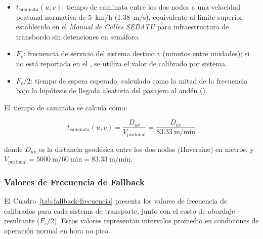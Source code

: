 \begin{itemize}
    \item $t_{\text{caminata}}(u, v)$: tiempo de caminata entre los dos nodos
    a una velocidad peatonal normativa de 5~km/h (1.38~m/s), equivalente al
    límite superior establecido en el \textit{Manual de Calles SEDATU}
\citep{sedatu2019manual} para infraestructura de transbordo sin detenciones
    en semáforo.
    \item $F_v$: frecuencia de servicio del sistema destino $v$ (minutos entre
    unidades); si no está reportada en el \geojson{}, se utiliza el valor
    de  calibrado por sistema.
    \item $F_v / 2$: tiempo de espera esperado, calculado como la mitad de la
    frecuencia bajo la hipótesis de llegada aleatoria del pasajero al andén
    ().
\end{itemize}

El tiempo de caminata se calcula como:

\begin{equation}
    t_{\text{caminata}}(u, v) = \frac{D_{uv}}{V_{\text{peatonal}}}
    = \frac{D_{uv}}{83.33\ \text{m/min}}
    \label{eq:t-caminata}
\end{equation}

donde $D_{uv}$ es la distancia geodésica entre los dos nodos (Haversine) en
metros, y
$V_{\text{peatonal}} = 5000\ \text{m} / 60\ \text{min} = 83.33\ \text{m/min}$.

\subsubsection{Valores de Frecuencia de Fallback}
\label{subsubsec:fallback-frecuencia}

El Cuadro~\ref{tab:fallback-frecuencia} presenta los valores de frecuencia de
 calibrados para cada sistema de transporte, junto con el
costo de abordaje resultante ($F_v / 2$). Estos valores representan intervalos
promedio en condiciones de operación normal en hora no pico.

